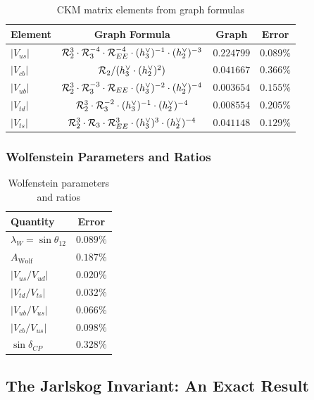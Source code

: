 \begin{table}[h]
\centering
\caption{CKM matrix elements from graph formulas}
\label{tab:ckm_elements}
\begin{tabular}{lccc}
\hline\hline
Element & Graph Formula & Graph & Error \\
\hline
$|V_{us}|$ & $\mathcal{R}_2^3 \cdot \mathcal{R}_3^{-4} \cdot \mathcal{R}_{EE}^{-4} \cdot (h^\vee_3)^{-1} \cdot (h^\vee_2)^{-3}$ & $0.224799$ & $0.089\%$ \\
$|V_{cb}|$ & $\mathcal{R}_2 / (h^\vee_3 \cdot (h^\vee_2)^2)$ & $0.041667$ & $0.366\%$ \\
$|V_{ub}|$ & $\mathcal{R}_2^3 \cdot \mathcal{R}_3^{-3} \cdot \mathcal{R}_{EE} \cdot (h^\vee_3)^{-2} \cdot (h^\vee_2)^{-4}$ & $0.003654$ & $0.155\%$ \\
$|V_{td}|$ & $\mathcal{R}_2^3 \cdot \mathcal{R}_3^{-2} \cdot (h^\vee_3)^{-1} \cdot (h^\vee_2)^{-4}$ & $0.008554$ & $0.205\%$ \\
$|V_{ts}|$ & $\mathcal{R}_2^3 \cdot \mathcal{R}_3 \cdot \mathcal{R}_{EE}^3 \cdot (h^\vee_3)^3 \cdot (h^\vee_2)^{-4}$ & $0.041148$ & $0.129\%$ \\
\hline\hline
\end{tabular}
\end{table}

\subsubsection{Wolfenstein Parameters and Ratios}

\begin{table}[h]
\centering
\caption{Wolfenstein parameters and ratios}
\label{tab:ckm_wolfenstein}
\begin{tabular}{lc}
\hline\hline
Quantity & Error \\
\hline
$\lambda_W = \sin\theta_{12}$ & $0.089\%$ \\
$A_{\mathrm{Wolf}}$ & $0.187\%$ \\
$|V_{us}/V_{ud}|$ & $\mathbf{0.020\%}$ \\
$|V_{td}/V_{ts}|$ & $\mathbf{0.032\%}$ \\
$|V_{ub}/V_{us}|$ & $\mathbf{0.066\%}$ \\
$|V_{cb}/V_{us}|$ & $0.098\%$ \\
$\sin\delta_{CP}$ & $0.328\%$ \\
\hline\hline
\end{tabular}
\end{table}

\subsection{The Jarlskog Invariant: An Exact Result}\label{sec:jarlskog}

